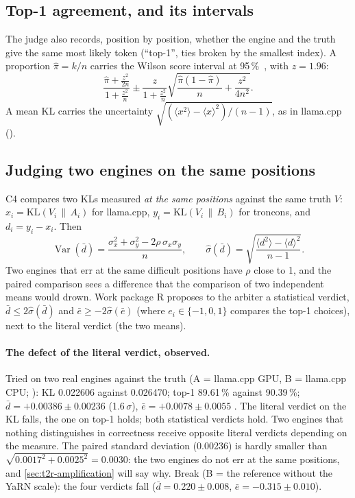 \subsection{Top-1 agreement, and its intervals}

The judge also records, position by position, whether the engine and the truth give the same most likely token (\enquote{top-1}, ties broken by the smallest index). A proportion $\hat\pi = k/n$ carries the Wilson score interval at 95\,\%~\cite{wilson1927}, with $z = 1.96$:
\begin{equation}\label{eq:t2r-wilson}
\frac{\hat\pi + \frac{z^2}{2n}}{1 + \frac{z^2}{n}} \pm \frac{z}{1 + \frac{z^2}{n}}\sqrt{\frac{\hat\pi(1-\hat\pi)}{n} + \frac{z^2}{4n^2}} .
\end{equation}
A mean KL carries the uncertainty $\sqrt{(\langle x^2\rangle - \langle x\rangle^2)/(n-1)}$, as in llama.cpp ().

\subsection{Judging two engines on the same positions}\label{sec:t2r-apparie}

C4 compares two KLs measured \emph{at the same positions} against the same truth $V$: $x_i = \mathrm{KL}(V_i\,\|\,A_i)$ for llama.cpp, $y_i = \mathrm{KL}(V_i\,\|\,B_i)$ for troncons, and $d_i = y_i - x_i$. Then
\begin{equation}\label{eq:t2r-apparie}
\operatorname{Var}(\bar d) = \frac{\sigma_x^2 + \sigma_y^2 - 2\rho\,\sigma_x\sigma_y}{n},\qquad
\hat\sigma(\bar d) = \sqrt{\frac{\langle d^2\rangle - \langle d\rangle^2}{n-1}} .
\end{equation}
Two engines that err at the same difficult positions have $\rho$ close to 1, and the paired comparison sees a difference that the comparison of two independent means would drown. Work package R proposes to the arbiter a statistical verdict, $\bar d \le 2\hat\sigma(\bar d)$ and $\bar e \ge -2\hat\sigma(\bar e)$ (where $e_i \in \{-1, 0, 1\}$ compares the top-1 choices), next to the literal verdict (the two means).

\paragraph{The defect of the literal verdict, observed.} Tried on two real engines against the truth (A = llama.cpp GPU, B = llama.cpp CPU; ): KL 0.022606 against 0.026470; top-1 89.61\,\% against 90.39\,\%; $\bar d = +0.00386 \pm 0.00236$ (1.6\,$\sigma$), $\bar e = +0.0078 \pm 0.0055$ \mes. The literal verdict on the KL falls, the one on top-1 holds; both statistical verdicts hold. Two engines that nothing distinguishes in correctness receive opposite literal verdicts depending on the measure. The paired standard deviation (0.00236) is hardly smaller than $\sqrt{0.0017^2 + 0.0025^2} = 0.0030$: the two engines do not err at the same positions, and \cref{sec:t2r-amplification} will say why. Break (B = the reference without the YaRN scale): the four verdicts fall ($\bar d = 0.220 \pm 0.008$, $\bar e = -0.315 \pm 0.010$).

